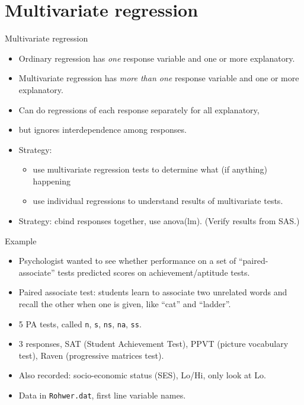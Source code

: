 \section{Multivariate regression}

\begin{frame}{Multivariate regression}
  
  \begin{itemize}
  \item Ordinary regression has \emph{one} response variable and one
    or more explanatory.
  \item Multivariate regression has \emph{more than one} response
    variable and one or more explanatory.
  \item Can do regressions of each response separately for all
    explanatory,
  \item but ignores interdependence among responses.
  \item Strategy:
    \begin{itemize}
    \item use multivariate regression tests to determine what (if
      anything) happening
    \item use individual regressions to understand results of
      multivariate tests.
    \end{itemize}
  \item Strategy: cbind responses together, use anova(lm). (Verify
    results from SAS.)

  \end{itemize}

\end{frame}


\begin{frame}[fragile]{Example}

  \begin{itemize}
  \item Psychologist wanted to see whether performance on a set of
    ``paired-associate'' tests predicted scores on achievement/aptitude
    tests.
  \item Paired associate test:
    students learn to associate
    two unrelated words and recall the other when one is given, like
    ``cat'' and ``ladder''.
  \item 5 PA tests, called \texttt{n}, \texttt{s}, \texttt{ns},
    \texttt{na}, \texttt{ss}.
  \item 3 responses, SAT (Student Achievement Test), PPVT (picture
    vocabulary test), Raven (progressive matrices test).
  \item Also recorded: socio-economic status (SES), Lo/Hi, only look at Lo.
  \item Data in \texttt{Rohwer.dat}, first line variable names.
  \end{itemize}

\end{frame}

